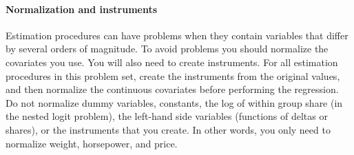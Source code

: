 \documentclass[12pt]{article}
\begin{document}
\paragraph{Normalization and instruments} Estimation procedures can have problems when they contain variables that differ by several orders of magnitude. To avoid problems you should normalize the covariates you use. You will also need to create instruments. For all estimation procedures in this problem set, create the instruments from the original values, and then normalize the continuous covariates before performing the regression. Do not normalize dummy variables, constants, the log of within group share (in the nested logit problem), the left-hand side variables (functions of deltas or shares), or the instruments that you create. In other words, you only need to normalize weight, horsepower, and price. \\
\end{document}
